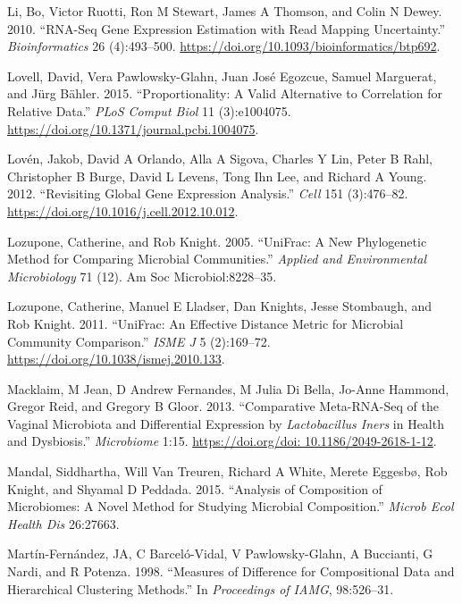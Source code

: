 \documentclass[onecolumn]{book}
\theoremstyle{definition}
\theoremstyle{definition}
\theoremstyle{definition}
\theoremstyle{remark}
\begin{document}
\leavevmode\hypertarget{ref-Li:2010aa}{}%
Li, Bo, Victor Ruotti, Ron M Stewart, James A Thomson, and Colin N
Dewey. 2010. ``RNA-Seq Gene Expression Estimation with Read Mapping
Uncertainty.'' \emph{Bioinformatics} 26 (4):493--500.
\url{https://doi.org/10.1093/bioinformatics/btp692}.

\leavevmode\hypertarget{ref-Lovell:2015}{}%
Lovell, David, Vera Pawlowsky-Glahn, Juan José Egozcue, Samuel
Marguerat, and Jürg Bähler. 2015. ``Proportionality: A Valid Alternative
to Correlation for Relative Data.'' \emph{PLoS Comput Biol} 11
(3):e1004075. \url{https://doi.org/10.1371/journal.pcbi.1004075}.

\leavevmode\hypertarget{ref-Loven:2012aa}{}%
Lovén, Jakob, David A Orlando, Alla A Sigova, Charles Y Lin, Peter B
Rahl, Christopher B Burge, David L Levens, Tong Ihn Lee, and Richard A
Young. 2012. ``Revisiting Global Gene Expression Analysis.'' \emph{Cell}
151 (3):476--82. \url{https://doi.org/10.1016/j.cell.2012.10.012}.

\leavevmode\hypertarget{ref-unifrac:2005}{}%
Lozupone, Catherine, and Rob Knight. 2005. ``UniFrac: A New Phylogenetic
Method for Comparing Microbial Communities.'' \emph{Applied and
Environmental Microbiology} 71 (12). Am Soc Microbiol:8228--35.

\leavevmode\hypertarget{ref-Lozupone:2011aa}{}%
Lozupone, Catherine, Manuel E Lladser, Dan Knights, Jesse Stombaugh, and
Rob Knight. 2011. ``UniFrac: An Effective Distance Metric for Microbial
Community Comparison.'' \emph{ISME J} 5 (2):169--72.
\url{https://doi.org/10.1038/ismej.2010.133}.

\leavevmode\hypertarget{ref-macklaim:2013}{}%
Macklaim, M Jean, D Andrew Fernandes, M Julia Di Bella, Jo-Anne Hammond,
Gregor Reid, and Gregory B Gloor. 2013. ``Comparative Meta-RNA-Seq of
the Vaginal Microbiota and Differential Expression by
\emph{Lactobacillus Iners} in Health and Dysbiosis.'' \emph{Microbiome}
1:15.
\href{https://doi.org/doi:\%2010.1186/2049-2618-1-12}{https://doi.org/doi: 10.1186/2049-2618-1-12}.

\leavevmode\hypertarget{ref-ancom:2015}{}%
Mandal, Siddhartha, Will Van Treuren, Richard A White, Merete Eggesbø,
Rob Knight, and Shyamal D Peddada. 2015. ``Analysis of Composition of
Microbiomes: A Novel Method for Studying Microbial Composition.''
\emph{Microb Ecol Health Dis} 26:27663.

\leavevmode\hypertarget{ref-martin1998measures}{}%
Martín-Fernández, JA, C Barceló-Vidal, V Pawlowsky-Glahn, A Buccianti, G
Nardi, and R Potenza. 1998. ``Measures of Difference for Compositional
Data and Hierarchical Clustering Methods.'' In \emph{Proceedings of
IAMG}, 98:526--31.
\end{document}
